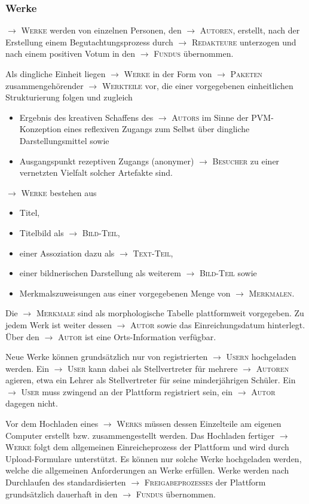 \documentclass[a4paper,11pt]{article}
\newcommand{\glossar}[1]{{$\to$ \textsc{#1}}}
\begin{document}
\subsubsection{Werke}

\glossar{Werke} werden von einzelnen Personen, den \glossar{Autoren}, erstellt,
nach der Erstellung einem Begutachtungsprozess durch \glossar{Redakteure}
unterzogen und nach einem positiven Votum in den \glossar{Fundus} übernommen.

Als dingliche Einheit liegen \glossar{Werke} in der Form von \glossar{Paketen}
zusammengehörender \glossar{Werkteile} vor, die einer vorgegebenen
einheitlichen Strukturierung folgen und zugleich
\begin{itemize}\itemsep0pt
\item Ergebnis des kreativen Schaffens des \glossar{Autors} im Sinne der
  PVM-Konzeption eines reflexiven Zugangs zum Selbst über dingliche
  Darstellungsmittel sowie
\item Ausgangspunkt rezeptiven Zugangs (anonymer) \glossar{Besucher} zu einer
  vernetzten Vielfalt solcher Artefakte sind.
\end{itemize}

\glossar{Werke} bestehen aus
\begin{itemize}\itemsep0pt
\item Titel, 
\item Titelbild als \glossar{Bild-Teil},  
\item einer Assoziation dazu als \glossar{Text-Teil}, 
\item einer bildnerischen Darstellung als weiterem \glossar{Bild-Teil} sowie
\item Merkmalszuweisungen aus einer vorgegebenen Menge von
  \glossar{Merkmalen}. 
\end{itemize}
Die \glossar{Merkmale} sind als morphologische Tabelle plattformweit
vorgegeben.  Zu jedem Werk ist weiter dessen \glossar{Autor} sowie das
Einreichungsdatum hinterlegt.  Über den \glossar{Autor} ist eine
Orts-Information verfügbar.

Neue Werke können grundsätzlich nur von registrierten \glossar{Usern}
hochgeladen werden.  Ein \glossar{User} kann dabei als Stellvertreter für
mehrere \glossar{Autoren} agieren, etwa ein Lehrer als Stellvertreter für
seine minderjährigen Schüler.  Ein \glossar{User} muss zwingend an der
Plattform registriert sein, ein \glossar{Autor} dagegen nicht.

Vor dem Hochladen eines \glossar{Werks} müssen dessen Einzelteile am eigenen
Computer erstellt bzw. zusammengestellt werden.  Das Hochladen fertiger
\glossar{Werke} folgt dem allgemeinen Einreicheprozess der Plattform und wird
durch Upload-Formulare unterstützt.  Es können nur solche Werke hochgeladen
werden, welche die allgemeinen Anforderungen an Werke erfüllen. Werke werden
nach Durchlaufen des standardisierten \glossar{Freigabeprozesses} der Plattform
grundsätzlich dauerhaft in den \glossar{Fundus} übernommen.  
\end{document}
